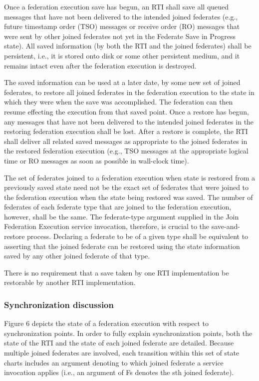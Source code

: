 Once a federation execution save has begun, an RTI shall save all queued messages that have not been delivered to the intended joined federates (e.g., future timestamp order (TSO) messages or receive order (RO) messages that were sent by other joined federates not yet in the Federate Save in Progress state). All saved information (by both the RTI and the joined federates) shall be persistent, i.e., it is stored onto disk or some other persistent medium, and it remains intact even after the federation execution is destroyed.

\clearpage

The saved information can be used at a later date, by some new set of joined federates, to restore all joined federates in the federation execution to the state in which they were when the save was accomplished. The federation can then resume effecting the execution from that saved point. Once a restore has begun, any messages that have not been delivered to the intended joined federates in the restoring federation execution shall be lost. After a restore is complete, the RTI shall deliver all related saved messages as appropriate to the joined federates in the restored federation execution (e.g., TSO messages at the appropriate logical time or RO messages as soon as possible in wall-clock time).

The set of federates joined to a federation execution when state is restored from a previously saved state need not be the exact set of federates that were joined to the federation execution when the state being restored was saved. The number of federates of each federate type that are joined to the federation execution, however, shall be the same. The federate-type argument supplied in the Join Federation Execution service invocation, therefore, is crucial to the save-and-restore process. Declaring a federate to be of a given type shall be equivalent to asserting that the joined federate can be restored using the state information saved by any other joined federate of that type.

There is no requirement that a save taken by one RTI implementation be restorable by another RTI implementation.

\subsubsection{Synchronization discussion}

Figure 6 depicts the state of a federation execution with respect to synchronization points. In order to fully explain synchronization points, both the state of the RTI and the state of each joined federate are detailed. Because multiple joined federates are involved, each transition within this set of state charts includes an argument denoting to which joined federate a service invocation applies (i.e., an argument of Fs denotes the sth joined federate).

